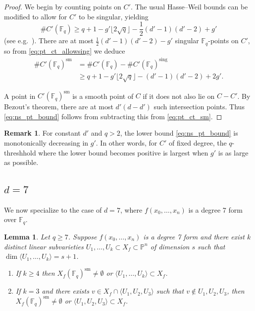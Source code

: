 \documentclass{amsart}
\newcommand{\F}{\mathbb{F}}
\renewcommand{\P}{\mathbb{P}}
\newcommand{\Span}[1]{\langle #1 \rangle}
\newcommand{\sm}{\mathrm{sm}}
\newtheorem{lemma}[theorem]{Lemma}
\theoremstyle{definition}
\newtheorem{remark}[theorem]{Remark}
\numberwithin{equation}{section}
\numberwithin{table}{section}
\newcommand{\qbound}[1]{{\color{cyan}$q > {#1}$}}
\newcommand{\qboundgeq}[1]{{\color{cyan}$q \geq {#1}$}}
\renewcommand{\qbound}[1]{{$q > {#1}$}}
\renewcommand{\qboundgeq}[1]{{$q \geq {#1}$}}
\begin{document}
\begin{proof}
    We begin by counting points on $C'$. The usual Hasse--Weil bounds can be modified to allow for $C'$ to be singular, yielding
    \begin{equation}\label{eq:pt_ct_allowsing}
        \#C'(\F_q) \geq q+1 - g'\lfloor 2\sqrt{q} \rfloor - \frac12(d'-1)(d'-2) + g'
    \end{equation}
    (see e.g.\ \cite[Corollary 1]{LeepYeomans1994_singular_curves}). There are at most $\frac12(d'-1)(d'-2) - g'$ singular $\F_q$-points on $C'$, so from \eqref{eq:pt_ct_allowsing} we deduce
    \begin{align}\label{eq:pt_ct_sm}
        \nonumber \#C'(\F_q)^\sm &= \#C'(\F_q) - \#C'(\F_q)^{\mathrm{sing}}\\
        &\geq q+1 - g'\lfloor 2\sqrt{q} \rfloor - (d'-1)(d'-2) + 2g'.
    \end{align}

    A point in $C'(\F_q)^{\sm}$ is a smooth point of $C$ if it does not also lie on $C - C'$. By Bezout's theorem, there are at most $d'(d-d')$ such intersection points. Thus \eqref{eq:ns_pt_bound} follows from subtracting this from \eqref{eq:pt_ct_sm}.    
\end{proof}

\begin{remark}
    For constant $d'$ and \qbound{2}, the lower bound \eqref{eq:ns_pt_bound} is monotonically decreasing in $g'$. In other words, for $C'$ of fixed degree, the $q$-threshhold where the lower bound becomes positive is largest when $g'$ is as large as possible. 
\end{remark}

\subsection{\texorpdfstring{$d=7$}{d=7}}
\label{subsec:d=7}

We now specialize to the case of $d=7$, where $f(x_0,\ldots,x_n)$ is a degree 7 form over $\F_q$. 

\begin{lemma}
\label{lem:too_many_linears_d=7}
    Let \qboundgeq{7}. Suppose $f(x_0,\ldots,x_n)$ is a degree 7 form and there exist $k$ distinct linear subvarieties $U_1,\ldots,U_k \subset X_f \subset \P^n$ of dimension $s$ such that $\dim \Span{U_1,\ldots,U_k} = s+1$.
    \begin{enumerate}[label = (\roman*)]
        \item If $k \geq 4$ then $X_f(\F_q)^\sm \neq \emptyset$ or $\Span{U_1,\ldots,U_k} \subset X_f$.
        \item If $k =3$ and there exists $v \in X_f \cap \Span{U_1,U_2,U_3}$ such that $v \notin U_1,U_2,U_3$, then $X_f(\F_q)^\sm \neq \emptyset$ or $\Span{U_1,U_2,U_3} \subset X_f$.
    \end{enumerate}
\end{lemma}
\end{document}
